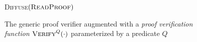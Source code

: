 \begin{figure}[t]
\begin{algorithm}[H]
    \caption{\label{alg.generic-verifier} The generic proof verifier augmented
        with a{ \em proof verification function} $\textsc{Verify}^Q(\cdot)$
        parameterized by a predicate $Q$}
    \begin{algorithmic}[1]
        \Statex
            \If{$\Pi \neq \emptyset$}
            \EndIf
                \State\textsc{Diffuse}{$(\textsc{ReadProof})$}
            \EndIf
        \EndWhile
        \vskip8pt
    \end{algorithmic}
\end{algorithm}
\end{figure}
